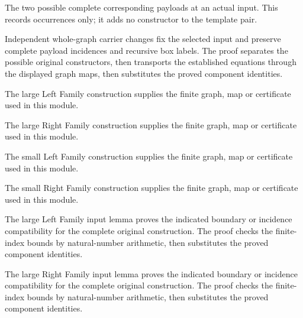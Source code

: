 The two possible complete corresponding payloads at an actual input.
This records occurrences only; it adds no constructor to the template pair.
\par{}

Independent whole-graph carrier changes fix the selected input and
preserve complete payload incidences and recursive box labels.
The proof separates the possible original constructors, then transports the established equations through the displayed graph maps, then substitutes the proved component identities.
\par{}

The large Left Family construction supplies the finite graph, map or certificate used in this module.
\par{}

The large Right Family construction supplies the finite graph, map or certificate used in this module.
\par{}

The small Left Family construction supplies the finite graph, map or certificate used in this module.
\par{}

The small Right Family construction supplies the finite graph, map or certificate used in this module.
\par{}

The large Left Family input lemma proves the indicated boundary or incidence compatibility for the complete original construction.
The proof checks the finite-index bounds by natural-number arithmetic, then substitutes the proved component identities.
\par{}

The large Right Family input lemma proves the indicated boundary or incidence compatibility for the complete original construction.
The proof checks the finite-index bounds by natural-number arithmetic, then substitutes the proved component identities.
\par{}

